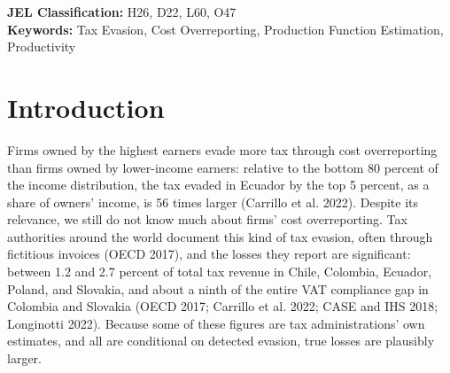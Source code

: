 \documentclass[
  12pt]{article}
\begin{document}
\begin{abstract}
The magnitude of detected overreporting matters for methods of
estimating production functions that exploit a flexible input to
identify productivity (Levinsohn and Petrin 2003; Doraszelski and
Jaumandreu 2013; Ackerberg et al. 2015; Gandhi et al. 2020). These
methods typically assume that materials are flexible, and their demand
or first-order conditions reveal productivity. However, materials are
commonly tax deductible and, thus, the input firms have the incentive to
overreport. I show that failing to correct for overreporting yields
output elasticities of materials that are larger, and productivity
distributions that are more dispersed and less persistent. Using the
production-function parameters, I estimate a structural model of firm
input overreporting to ask how does the expected claimed deductions, and
thus government revenue, respond to the tax rate, where expected claimed
deductions include true and undetected fictitious deductions.
Approaching the observed tax rate from the left, the expected deductions
elasticity of the tax rate is -9.7. Undetected overreporting costs the
government around 3 percent of potential sales-tax revenue.
\end{abstract}

\begin{center}
\textbf{JEL Classification:} H26, D22, L60, O47 \\
\textbf{Keywords:} Tax Evasion, Cost Overreporting, Production Function Estimation, Productivity
\end{center}
\bigskip


\section*{Introduction}\label{sec-intro}

Firms owned by the highest earners evade more tax through cost
overreporting than firms owned by lower-income earners: relative to the
bottom 80 percent of the income distribution, the tax evaded in Ecuador
by the top 5 percent, as a share of owners' income, is 56 times larger
(Carrillo et al. 2022). Despite its relevance, we still do not know much
about firms' cost overreporting. Tax authorities around the world
document this kind of tax evasion, often through fictitious invoices
(OECD 2017), and the losses they report are significant: between 1.2 and
2.7 percent of total tax revenue in Chile, Colombia, Ecuador, Poland,
and Slovakia, and about a ninth of the entire VAT compliance gap in
Colombia and Slovakia (OECD 2017; Carrillo et al. 2022; CASE and IHS
2018; Longinotti 2022). Because some of these figures are tax
administrations' own estimates, and all are conditional on detected
evasion, true losses are plausibly larger.
\end{document}
